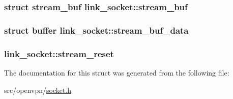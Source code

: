 \subsubsection[{stream\+\_\+buf}]{\setlength{\rightskip}{0pt plus 5cm}struct {\bf stream\+\_\+buf} link\+\_\+socket\+::stream\+\_\+buf}\label{structlink__socket_aadfcc653c136bad2c174066f4ff5b799}
\hypertarget{structlink__socket_acf50c66913a5c334fa9e7443a6dcc62f}{}
\subsubsection[{stream\+\_\+buf\+\_\+data}]{\setlength{\rightskip}{0pt plus 5cm}struct {\bf buffer} link\+\_\+socket\+::stream\+\_\+buf\+\_\+data}\label{structlink__socket_acf50c66913a5c334fa9e7443a6dcc62f}
\hypertarget{structlink__socket_af79d1156e0883558c7c06d2eaf9b636f}{}
\subsubsection[{stream\+\_\+reset}]{ link\+\_\+socket\+::stream\+\_\+reset}\label{structlink__socket_af79d1156e0883558c7c06d2eaf9b636f}


The documentation for this struct was generated from the following file\+:\begin{DoxyCompactItemize}
\item 
src/openvpn/\hyperlink{socket_8h}{socket.\+h}\end{DoxyCompactItemize}
